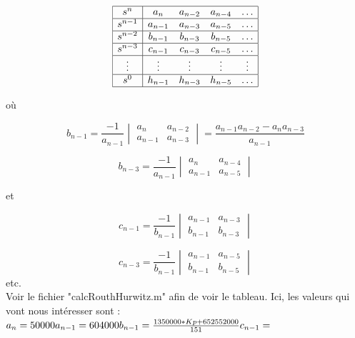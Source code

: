 \documentclass[a4paper,11pt]{article}
\begin{document}
\[
\begin{array}{|c|c c c c|}
    \hline
    s^n & a_n & a_{n-2} & a_{n-4} & \dots \\
    \hline
    s^{n-1} & a_{n-1} & a_{n-3} & a_{n-5} & \dots \\
    \hline
    s^{n-2} & b_{n-1} & b_{n-3} & b_{n-5} & \dots \\
    \hline
    s^{n-3} & c_{n-1} & c_{n-3} & c_{n-5} & \dots \\
    \hline
    \vdots & \vdots & \vdots & \vdots & \vdots \\
    \hline
    s^0 & h_{n-1} & h_{n-3} & h_{n-5} & \dots \\
    \hline
\end{array}
\]

où

\[
b_{n-1} = \frac{-1}{a_{n-1}}
\begin{vmatrix}
    a_n & a_{n-2} \\
    a_{n-1} & a_{n-3}
\end{vmatrix}
= \frac{a_{n-1} a_{n-2} - a_n a_{n-3}}{a_{n-1}}
\]

\[
b_{n-3} = \frac{-1}{a_{n-1}}
\begin{vmatrix}
    a_n & a_{n-4} \\
    a_{n-1} & a_{n-5}
\end{vmatrix}
\]

et

\[
c_{n-1} = \frac{-1}{b_{n-1}}
\begin{vmatrix}
    a_{n-1} & a_{n-3} \\
    b_{n-1} & b_{n-3}
\end{vmatrix}
\]

\[
c_{n-3} = \frac{-1}{b_{n-1}}
\begin{vmatrix}
    a_{n-1} & a_{n-5} \\
    b_{n-1} & b_{n-5}
\end{vmatrix}
\] etc.\\

Voir le fichier "calcRouthHurwitz.m" afin de voir le tableau. Ici, les valeurs qui vont nous intéresser sont :\\
$a_n = 50000\\
 a_{n-1} = 604000\\
 b_{n-1} = \frac{1350000*Kp + 652552000}{151}\\
 c_{n-1} =$ 
\end{document}
